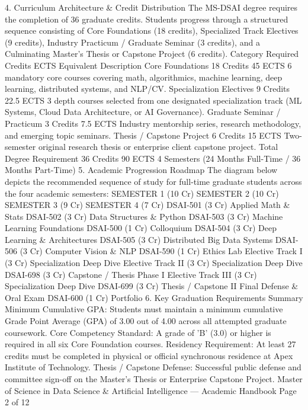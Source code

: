 \documentclass[12pt]{article}
\begin{document}
4. Curriculum Architecture \& Credit Distribution
The MS-DSAI degree requires the completion of 36 graduate credits. Students progress through a structured
sequence consisting of Core Foundations (18 credits), Specialized Track Electives (9 credits), Industry Practicum /
Graduate Seminar (3 credits), and a Culminating Master's Thesis or Capstone Project (6 credits).
Category
Required
Credits
ECTS
Equivalent
Description
Core Foundations
18 Credits
45 ECTS
6 mandatory core courses covering math, algorithmics, machine
learning, deep learning, distributed systems, and NLP/CV.
Specialization
Electives
9 Credits
22.5 ECTS
3 depth courses selected from one designated specialization track
(ML Systems, Cloud Data Architecture, or AI Governance).
Graduate Seminar /
Practicum
3 Credits
7.5 ECTS
Industry mentorship series, research methodology, and emerging
topic seminars.
Thesis / Capstone
Project
6 Credits
15 ECTS
Two-semester original research thesis or enterprise client capstone
project.
Total Degree
Requirement
36 Credits
90 ECTS
4 Semesters (24 Months Full-Time / 36 Months Part-Time)
5. Academic Progression Roadmap
The diagram below depicts the recommended sequence of study for full-time graduate students across the four
academic semesters:
SEMESTER 1 (10 Cr)
SEMESTER 2 (10 Cr)
SEMESTER 3 (9 Cr)
SEMESTER 4 (7 Cr)
DSAI-501 (3 Cr)
Applied Math \& Stats
DSAI-502 (3 Cr)
Data Structures \& Python
DSAI-503 (3 Cr)
Machine Learning Foundations
DSAI-500 (1 Cr) Colloquium
DSAI-504 (3 Cr)
Deep Learning \& Architectures
DSAI-505 (3 Cr)
Distributed Big Data Systems
DSAI-506 (3 Cr)
Computer Vision \& NLP
DSAI-590 (1 Cr) Ethics Lab
Elective Track I (3 Cr)
Specialization Deep Dive
Elective Track II (3 Cr)
Specialization Deep Dive
DSAI-698 (3 Cr)
Capstone / Thesis Phase I
Elective Track III (3 Cr)
Specialization Deep Dive
DSAI-699 (3 Cr)
Thesis / Capstone II
Final Defense \& Oral Exam
DSAI-600 (1 Cr) Portfolio
6. Key Graduation Requirements Summary
Minimum Cumulative GPA: Students must maintain a minimum cumulative Grade Point Average (GPA) of 3.00 out of
4.00 across all attempted graduate coursework.
Core Competency Standard: A grade of 'B' (3.0) or higher is required in all six Core Foundation courses.
Residency Requirement: At least 27 credits must be completed in physical or official synchronous residence at Apex
Institute of Technology.
Thesis / Capstone Defense: Successful public defense and committee sign-off on the Master's Thesis or Enterprise
Capstone Project.
Master of Science in Data Science \& Artificial Intelligence — Academic Handbook
Page 2 of 12
\end{document}
